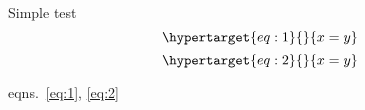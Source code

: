 Simple test
\begin{equation}\protect\hypertarget{eq:1}{}{x=y}\label{eq:1}\end{equation}
\begin{equation}\protect\hypertarget{eq:2}{}{x=y}\label{eq:2}\end{equation}

eqns.~\ref{eq:1}, \ref{eq:2}
